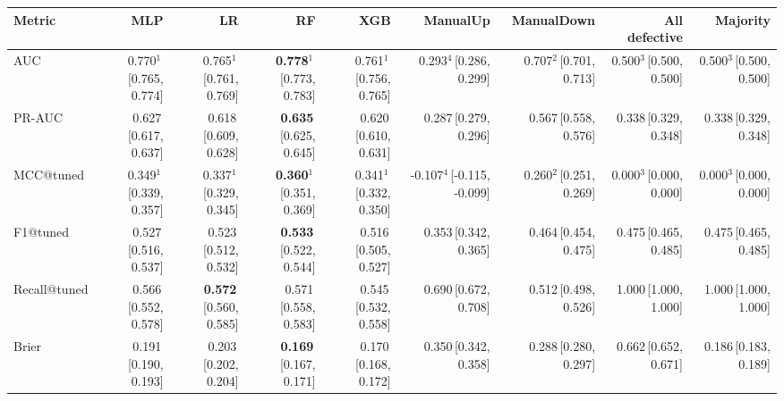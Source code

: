 \small
\begin{tabular}{lrrrrrrrr}
\toprule
Metric & MLP & LR & RF & XGB & ManualUp & ManualDown & All defective & Majority \\
\midrule
AUC & 0.770$^{1}$\,{\scriptsize[0.765, 0.774]} & 0.765$^{1}$\,{\scriptsize[0.761, 0.769]} & \textbf{0.778$^{1}$}\,{\scriptsize[0.773, 0.783]} & 0.761$^{1}$\,{\scriptsize[0.756, 0.765]} & 0.293$^{4}$\,{\scriptsize[0.286, 0.299]} & 0.707$^{2}$\,{\scriptsize[0.701, 0.713]} & 0.500$^{3}$\,{\scriptsize[0.500, 0.500]} & 0.500$^{3}$\,{\scriptsize[0.500, 0.500]} \\
PR-AUC & 0.627\,{\scriptsize[0.617, 0.637]} & 0.618\,{\scriptsize[0.609, 0.628]} & \textbf{0.635}\,{\scriptsize[0.625, 0.645]} & 0.620\,{\scriptsize[0.610, 0.631]} & 0.287\,{\scriptsize[0.279, 0.296]} & 0.567\,{\scriptsize[0.558, 0.576]} & 0.338\,{\scriptsize[0.329, 0.348]} & 0.338\,{\scriptsize[0.329, 0.348]} \\
MCC@tuned & 0.349$^{1}$\,{\scriptsize[0.339, 0.357]} & 0.337$^{1}$\,{\scriptsize[0.329, 0.345]} & \textbf{0.360$^{1}$}\,{\scriptsize[0.351, 0.369]} & 0.341$^{1}$\,{\scriptsize[0.332, 0.350]} & -0.107$^{4}$\,{\scriptsize[-0.115, -0.099]} & 0.260$^{2}$\,{\scriptsize[0.251, 0.269]} & 0.000$^{3}$\,{\scriptsize[0.000, 0.000]} & 0.000$^{3}$\,{\scriptsize[0.000, 0.000]} \\
F1@tuned & 0.527\,{\scriptsize[0.516, 0.537]} & 0.523\,{\scriptsize[0.512, 0.532]} & \textbf{0.533}\,{\scriptsize[0.522, 0.544]} & 0.516\,{\scriptsize[0.505, 0.527]} & 0.353\,{\scriptsize[0.342, 0.365]} & 0.464\,{\scriptsize[0.454, 0.475]} & 0.475\,{\scriptsize[0.465, 0.485]} & 0.475\,{\scriptsize[0.465, 0.485]} \\
Recall@tuned & 0.566\,{\scriptsize[0.552, 0.578]} & \textbf{0.572}\,{\scriptsize[0.560, 0.585]} & 0.571\,{\scriptsize[0.558, 0.583]} & 0.545\,{\scriptsize[0.532, 0.558]} & 0.690\,{\scriptsize[0.672, 0.708]} & 0.512\,{\scriptsize[0.498, 0.526]} & 1.000\,{\scriptsize[1.000, 1.000]} & 1.000\,{\scriptsize[1.000, 1.000]} \\
Brier & 0.191\,{\scriptsize[0.190, 0.193]} & 0.203\,{\scriptsize[0.202, 0.204]} & \textbf{0.169}\,{\scriptsize[0.167, 0.171]} & 0.170\,{\scriptsize[0.168, 0.172]} & 0.350\,{\scriptsize[0.342, 0.358]} & 0.288\,{\scriptsize[0.280, 0.297]} & 0.662\,{\scriptsize[0.652, 0.671]} & 0.186\,{\scriptsize[0.183, 0.189]} \\

\end{tabular}

